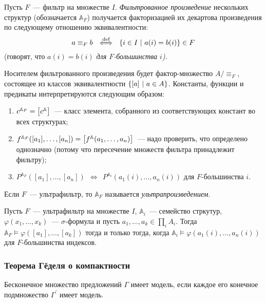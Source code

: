 \begin{definition}
    Пусть $F$~— фильтр на множестве $I$. \emph{Фильтрованное произведение} нескольких структур (обозначается $\mathbb{A}_F$) получается факторизацией их декартова произведения по следующему отношению эквивалентности:
	\[a \equiv_F b\ \ \overset{\text{def}}{\Longleftrightarrow}\ \ 
	  \set*{i \in I\ \middle\vert\ a(i) = b(i)} \in F\]    
    (говорят, что $a(i) = b(i)$ \emph{для $F$-большинства $i$).}

    Носителем фильтрованного произведения будет фактор-множество \(A / {\equiv_F}\), состоящее из классов эквивалентности \(\set*{ \segment*{a}\ \middle\vert\ a \in A}\). Константы, функции и предикаты интерпретируются следующим образом:
    \begin{enumerate}
	\item $c^{\mathbb{A}_F} = \segment*{c^{\mathbb{A}}}$~— класс элемента, собранного из соответствующих констант во всех структурах;
	\item $f^{\mathbb{A}_F}\lr*{[a_1], \ldots, [a_n]} =
	      \segment*{f^{\mathbb{A}}\lr*{a_1, \ldots, a_n}}$~— надо проверить, что определено однозначно (потому что пересечение множеств фильтра принадлежит фильтру); 
	\item $P^{\mathbb{A}_F}([a_1], \ldots, [a_n])\ \ \Longleftrightarrow\ \ 
	       P^{\mathbb{A}_i} (a_1(i), \ldots, a_n(i))$ для $F$-большинства $i$. 
    \end{enumerate}
\end{definition} 

    Если $F$~— ультрафильтр, то $\mathbb{A}_{F}$ называется \textit{ультрапроизведением}.


\begin{theorem}[об ультрапроизведениях]
    Пусть $F$~— ультрафильтр на множестве $I$, $\mathbb{A}_i$~— семейство стркутур, $\varphi(x_1, \ldots, x_k)$~— $\sigma$-формула и пусть $a_1, \ldots, a_k \in \prod_i A_i$. Тогда $\mathbb{A}_F \models \varphi([a_1], \ldots, [a_k])$ тогда и только тогда, когда $\mathbb{A}_i \models \varphi(a_1(i), \ldots, a_n(i))$ для $F$-большинства индексов.
\end{theorem} 

\subsubsection{Теорема Гёделя о компактности} 

\begin{theorem}
    Бесконечное множество предложений $\Gamma$ имеет модель, если каждое его конечное подмножество $\Gamma^\prime$ имеет модель.
\end{theorem}



